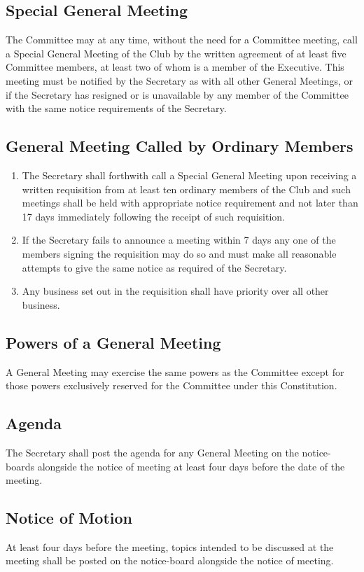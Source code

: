 \documentclass[11pt]{article} %
\begin{document}
\subsection{Special General Meeting}
The Committee may at any time, without the need for a Committee meeting, call a Special General Meeting of the Club by the written agreement of at least five Committee members, at least two of whom is a member of the Executive. This meeting must be notified by the Secretary as with all other General Meetings, or if the Secretary has resigned or is unavailable by any member of the Committee with the same notice requirements of the Secretary.\\

\subsection{General Meeting Called by Ordinary Members}
\begin{enumerate}
	\item The Secretary shall forthwith call a Special General Meeting upon receiving a written requisition from at least ten ordinary members of the Club and such meetings shall be held with appropriate notice requirement and not later than 17 days immediately following the receipt of such requisition.
	\item If the Secretary fails to announce a meeting within 7 days any one of the members signing the requisition may do so and must make all reasonable attempts to give the same notice as required of the Secretary.
	\item Any business set out in the requisition shall have priority over all other business.
\end{enumerate}

\subsection{Powers of a General Meeting}
A General Meeting may exercise the same powers as the Committee except for those powers exclusively reserved for the Committee under this Constitution.
\subsection{Agenda}
The Secretary shall post the agenda for any General Meeting on the notice-boards alongside the notice of meeting at least four days before the date of the meeting.

\subsection{Notice of Motion}
At least four days before the meeting, topics intended to be discussed at the meeting shall be posted on the notice-board alongside the notice of meeting.
\end{document}
